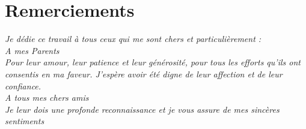 \restoregeometry
\chapter*{\huge Remerciements}

\begin{center}
\it \Large
Je dédie ce travail à tous ceux qui me sont chers et particulièrement : \\

A mes Parents\\
Pour leur amour, leur patience et leur générosité, pour tous les efforts qu’ils ont consentis en ma faveur. J’espère avoir été digne de leur affection et de leur confiance.\\
A tous mes chers amis\\
Je leur dois une profonde reconnaissance et je vous assure de mes sincères sentiments
\end{center}
